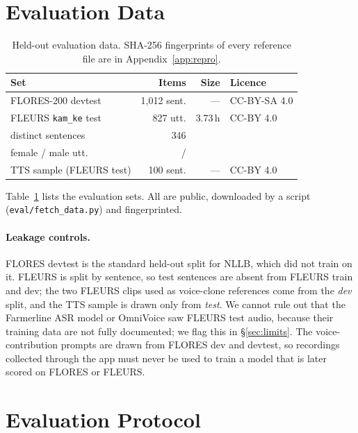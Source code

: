 \documentclass[11pt]{article}
\begin{document}
\section{Evaluation Data}
\label{sec:data}

\begin{table}[t]
\centering\small
\begin{tabular}{@{}lrrl@{}}
\toprule
Set & Items & Size & Licence \\
\midrule
FLORES-200 devtest & 1,012 sent. & --- & CC-BY-SA 4.0 \\
FLEURS \texttt{kam\_ke} test & 827 utt. & 3.73\,h & CC-BY 4.0 \\
\quad distinct sentences & 346 & & \\
\quad female / male utt. & \asrNFemale{} / \asrNMale{} & & \\
TTS sample (FLEURS test) & 100 sent. & --- & CC-BY 4.0 \\
\bottomrule
\end{tabular}
\caption{Held-out evaluation data. SHA-256 fingerprints of every reference file are in Appendix~\ref{app:repro}.}
\label{tab:data}
\end{table}

Table~\ref{tab:data} lists the evaluation sets. All are public, downloaded by a script (\texttt{eval/fetch\_data.py}) and fingerprinted.

\paragraph{Leakage controls.} FLORES devtest is the standard held-out split for NLLB, which did not train on it. FLEURS is split by sentence, so test sentences are absent from FLEURS train and dev; the two FLEURS clips used as voice-clone references come from the \emph{dev} split, and the TTS sample is drawn only from \emph{test}. We cannot rule out that the Farmerline ASR model or OmniVoice saw FLEURS test audio, because their training data are not fully documented; we flag this in \S\ref{sec:limits}. The voice-contribution prompts are drawn from FLORES dev and devtest, so recordings collected through the app must never be used to train a model that is later scored on FLORES or FLEURS.

\section{Evaluation Protocol}
\label{sec:protocol}
\end{document}
